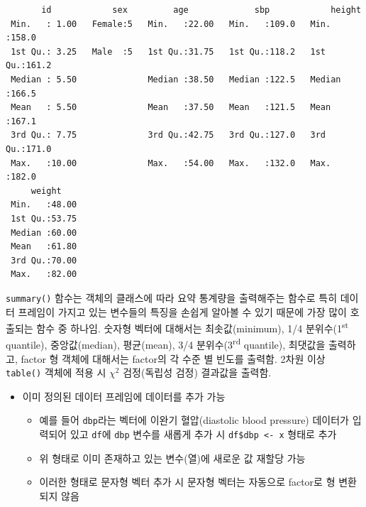 \documentclass[
  11pt,
]{krantz}
\makeatletter
\providecommand{\tightlist}{%
  \setlength{\itemsep}{0pt}\setlength{\parskip}{0pt}}
\newenvironment{kframe}{%
\medskip{}
\setlength{\fboxsep}{.8em}
 \def\at@end@of@kframe{}%
 \ifinner\ifhmode%
  \def\at@end@of@kframe{\end{minipage}}%
  \begin{minipage}{\columnwidth}%
 \fi\fi%
 \def\FrameCommand##1{\hskip\@totalleftmargin \hskip-\fboxsep
 \colorbox{shadecolor}{##1}\hskip-\fboxsep
     \hskip-\linewidth \hskip-\@totalleftmargin \hskip\columnwidth}%
 \MakeFramed {\advance\hsize-\width
   \@totalleftmargin\z@ \linewidth\hsize
   \@setminipage}}%
 {\par\unskip\endMakeFramed%
 \at@end@of@kframe}
\newenvironment{rmdblock}[1]
  {
  \begin{itemize}
  \renewcommand{\labelitemi}{
    \raisebox{-.7\height}[0pt][0pt]{
      {\setkeys{Gin}{width=3em,keepaspectratio}\texttt{[image: images/\#1]}}
    }
  }
  \setlength{\fboxsep}{1em}
  \begin{kframe}
  \item
  }
  {
  \end{kframe}
  \end{itemize}
  }
\newenvironment{rmdtip}
  {\begin{rmdblock}{tip}}
  {\end{rmdblock}}
\makeatother
\begin{document}
\begin{verbatim}
       id            sex         age             sbp            height     
 Min.   : 1.00   Female:5   Min.   :22.00   Min.   :109.0   Min.   :158.0  
 1st Qu.: 3.25   Male  :5   1st Qu.:31.75   1st Qu.:118.2   1st Qu.:161.2  
 Median : 5.50              Median :38.50   Median :122.5   Median :166.5  
 Mean   : 5.50              Mean   :37.50   Mean   :121.5   Mean   :167.1  
 3rd Qu.: 7.75              3rd Qu.:42.75   3rd Qu.:127.0   3rd Qu.:171.0  
 Max.   :10.00              Max.   :54.00   Max.   :132.0   Max.   :182.0  
     weight     
 Min.   :48.00  
 1st Qu.:53.75  
 Median :60.00  
 Mean   :61.80  
 3rd Qu.:70.00  
 Max.   :82.00  
\end{verbatim}

\normalsize

\footnotesize

\begin{rmdtip}
\begin{rmdtip}

\texttt{summary()} 함수는 객체의 클래스에 따라 요약 통계량을 출력해주는 함수로 특히 데이터 프레임이 가지고 있는 변수들의 특징을 손쉽게 알아볼 수 있기 때문에 가장 많이 호출되는 함수 중 하나임. 숫자형 벡터에 대해서는 최솟값(minimum), 1/4 분위수(1\textsuperscript{st} quantile), 중앙값(median), 평균(mean), 3/4 분위수(3\textsuperscript{rd} quantile), 최댓값을 출력하고, factor 형 객체에 대해서는 factor의 각 수준 별 빈도를 출력함. 2차원 이상 \texttt{table()} 객체에 적용 시 \(\chi^2\) 검정(독립성 검정) 결과값을 출력함.

\end{rmdtip}
\end{rmdtip}

\normalsize

\begin{itemize}
\tightlist
\item
  이미 정의된 데이터 프레임에 데이터를 추가 가능

  \begin{itemize}
  \tightlist
  \item
    예를 들어 \texttt{dbp}라는 벡터에 이완기 혈압(diastolic blood pressure) 데이터가 입력되어 있고 \texttt{df}에 \texttt{dbp} 변수를 새롭게 추가 시 \texttt{df\$dbp\ \textless{}-\ x} 형태로 추가
  \item
    위 형태로 이미 존재하고 있는 변수(열)에 새로운 값 재할당 가능
  \item
    이러한 형태로 문자형 벡터 추가 시 문자형 벡터는 자동으로 factor로 형 변환 되지 않음
  \end{itemize}
\end{itemize}
\end{document}
